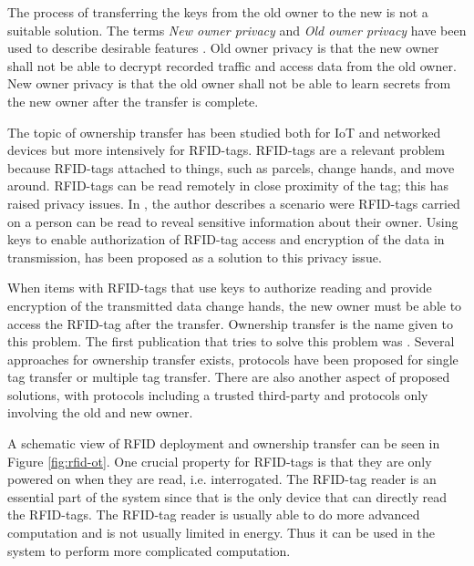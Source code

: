 The process of transferring the keys from the old owner to the new is not a suitable solution. The terms \emph{New owner privacy} and \emph{Old owner privacy} have been used to describe desirable features \cite{taqieddin2018tag}. Old owner privacy is that the new owner shall not be able to decrypt recorded traffic and access data from the old owner. New owner privacy is that the old owner shall not be able to learn secrets from the new owner after the transfer is complete.

The topic of ownership transfer has been studied both for IoT and networked devices but more intensively for RFID-tags. RFID-tags are a relevant problem because RFID-tags attached to things, such as parcels, change hands, and move around. RFID-tags can be read remotely in close proximity of the tag; this has raised privacy issues. In \cite{juels2006rfid}, the author describes a scenario were RFID-tags carried on a person can be read to reveal sensitive information about their owner. Using keys to enable authorization of RFID-tag access and encryption of the data in transmission, has been proposed as a solution to this privacy issue. 

When items with RFID-tags that use keys to authorize reading and provide encryption of the transmitted data change hands, the new owner must be able to access the RFID-tag after the transfer. Ownership transfer is the name given to this problem. The first publication that tries to solve this problem was \cite{saito2005reassignment}. 
Several approaches for ownership transfer exists, protocols have been proposed for single tag transfer or multiple tag transfer. There are also another aspect of proposed solutions, with protocols including a trusted third-party and protocols only involving the old and new owner. 

A schematic view of RFID deployment and ownership transfer can be seen in Figure \ref{fig:rfid-ot}. One crucial property for RFID-tags is that they are only powered on when they are read, i.e. interrogated. The RFID-tag reader is an essential part of the system since that is the only device that can directly read the RFID-tags. The RFID-tag reader is usually able to do more advanced computation and is not usually limited in energy. Thus it can be used in the system to perform more complicated computation.

